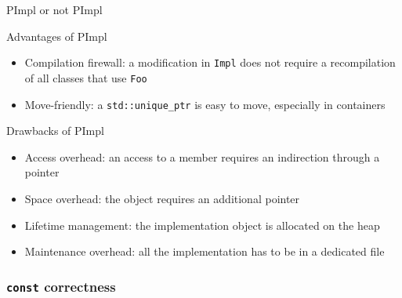 \begin{frame}{PImpl or not PImpl}{}
  \begin{block}{Advantages of PImpl}
    \begin{itemize}
    \item
      Compilation firewall: a modification in \lstinline!Impl! does not require a recompilation of all classes that use \lstinline!Foo!
    \item
      Move-friendly: a \lstinline!std::unique_ptr! is easy to move, especially in containers
    \end{itemize}
  \end{block}
  \begin{block}{Drawbacks of PImpl}
    \begin{itemize}
    \item
      Access overhead: an access to a member requires an indirection through a pointer
    \item
      Space overhead: the object requires an additional pointer
    \item
      Lifetime management: the implementation object is allocated on the heap
    \item
      Maintenance overhead: all the implementation has to be in a dedicated file
    \end{itemize}
  \end{block}
\end{frame}


\subsubsection{\texttt{const} correctness}

